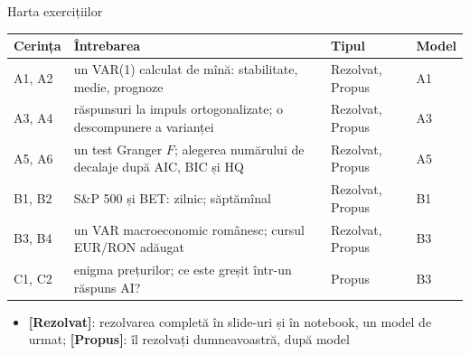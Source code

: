 \begin{frame}{Harta exercițiilor}
\itemsize{\small}
\begin{center}
\footnotesize
\begin{tabular}{>{\raggedright\arraybackslash}p{1.1cm}>{\raggedright\arraybackslash}p{7.5cm}>{\raggedright\arraybackslash}p{1.9cm}>{\raggedright\arraybackslash}p{1.4cm}}
\toprule
\textbf{Cerința} & \textbf{Întrebarea} & \textbf{Tipul} & \textbf{Model} \\
\midrule
A1, A2 & un VAR(1) calculat de mînă: stabilitate, medie, prognoze & Rezolvat, Propus & A1 \\
A3, A4 & răspunsuri la impuls ortogonalizate; o descompunere a varianței & Rezolvat, Propus & A3 \\
A5, A6 & un test Granger $F$; alegerea numărului de decalaje după AIC, BIC și HQ & Rezolvat, Propus & A5 \\
B1, B2 & S\&P 500 și BET: zilnic; săptămînal & Rezolvat, Propus & B1 \\
B3, B4 & un VAR macroeconomic românesc; cursul EUR/RON adăugat & Rezolvat, Propus & B3 \\
C1, C2 & enigma prețurilor; ce este greșit într-un răspuns AI? & Propus & B3 \\
\bottomrule
\end{tabular}
\end{center}
\begin{itemize}
    \item \textbf{[Rezolvat]}: rezolvarea completă în slide-uri și în notebook, un model de urmat; \textbf{[Propus]}: îl rezolvați dumneavoastră, după model
\end{itemize}
\end{frame}


